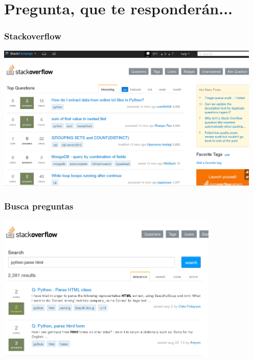 %
%

\section{Pregunta, que te responderán...}

\begin{frame}
\frametitle{Stackoverflow}

\begin{center}
\includegraphics[height=7cm]{figs/sof}
\end{center}

\end{frame}


\begin{frame}
\frametitle{Busca preguntas}

\begin{center}
\includegraphics[height=7cm]{figs/sof-questions}
\end{center}

\end{frame}


